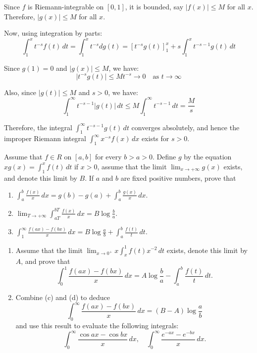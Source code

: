 Since $f$ is Riemann-integrable on $[0, 1]$, it is bounded, say $|f(x)| \leq M$ for all $x$. Therefore, $|g(x)| \leq M$ for all $x$.

Now, using integration by parts:
\[\int_{1}^{x} t^{-s} f(t) \, dt = \int_{1}^{x} t^{-s} dg(t) = \left[t^{-s} g(t)\right]_{1}^{x} + s \int_{1}^{x} t^{-s-1} g(t) \, dt\]

Since $g(1) = 0$ and $|g(x)| \leq M$, we have:
\[\left|t^{-s} g(t)\right| \leq M t^{-s} \to 0 \quad \text{as } t \to \infty\]

Also, since $|g(t)| \leq M$ and $s > 0$, we have:
\[\int_{1}^{\infty} t^{-s-1} |g(t)| \, dt \leq M \int_{1}^{\infty} t^{-s-1} \, dt = \frac{M}{s}\]

Therefore, the integral $\int_{1}^{\infty} t^{-s-1} g(t) \, dt$ converges absolutely, and hence the improper Riemann integral $\int_{1}^{\infty} x^{-s} f(x) \, dx$ exists for $s > 0$.

\begin{problembox}
Assume that $f \in R$ on $[a, b]$ for every $b > a > 0$. Define $g$ by the equation $xg(x) = \int_{1}^{x} f(t) \, dt$ if $x > 0$, assume that the limit $\lim_{x \to +\infty} g(x)$ exists, and denote this limit by $B$. If $a$ and $b$ are fixed positive numbers, prove that
\begin{enumerate}[label=(\alph*)]
    \item $\int_{a}^{b} \frac{f(x)}{x} \, dx = g(b) - g(a) + \int_{a}^{b} \frac{g(x)}{x} \, dx.$
    \item $\lim_{T \to +\infty} \int_{aT}^{bT} \frac{f(x)}{x} \, dx = B \log \frac{b}{a}.$
    \item $\int_{1}^{\infty} \frac{f(ax) - f(bx)}{x} \, dx = B \log \frac{a}{b} + \int_{a}^{b} \frac{f(t)}{t} \, dt.$
\end{enumerate}
\begin{enumerate}[label=(\alph*),resume]
    \item Assume that the limit $\lim_{x \to 0^+} x \int_{x}^{1} f(t)x^{-2} \, dt$ exists, denote this limit by $A$, and prove that
    \[\int_{0}^{1} \frac{f(ax) - f(bx)}{x} \, dx = A \log \frac{b}{a} - \int_{a}^{b} \frac{f(t)}{t} \, dt.\]
    \item Combine (c) and (d) to deduce
    \[\int_{0}^{\infty} \frac{f(ax) - f(bx)}{x} \, dx = (B - A) \log \frac{a}{b}\]
    and use this result to evaluate the following integrals:
    \[\int_{0}^{\infty} \frac{\cos ax - \cos bx}{x} \, dx, \quad \int_{0}^{\infty} \frac{e^{-ax} - e^{-bx}}{x} \, dx.\]
\end{enumerate}
\end{problembox}

